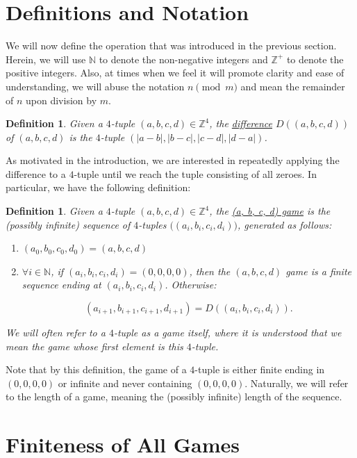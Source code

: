 \documentclass[12pt]{amsart}
\newtheorem{definition}[theorem]{Definition}
\newcommand{\breathe}{\vspace{0.2cm}}
\newcommand{\znn}{\mathbb{N}}
\newcommand{\zp}{\mathbb{Z}^+}
\begin{document}
\section{Definitions and Notation\label{sec:defs}}

We will now define the operation that was introduced in the previous section. Herein, we will use $\znn$ to denote the non-negative integers and $\zp$ to denote the positive integers. Also, at times when we feel it will promote clarity and ease of understanding, we will abuse the notation $n\pmod{m}$ and mean the remainder of $n$ upon division by $m$.

\begin{definition}
Given a $4$-tuple $(a, b, c, d)\in \mathbb{Z}^4$, the \underline{difference} $D((a, b, c, d))$ of $(a,b,c,d)$ is the $4$-tuple $(|a - b|, |b - c|, |c - d|, |d - a|)$.
\end{definition}

As motivated in the introduction, we are interested in repeatedly applying the difference to a $4$-tuple until we reach the tuple consisting of all zeroes. In particular, we have the following definition:

\begin{definition}
Given a $4$-tuple $(a, b, c, d)\in \mathbb{Z}^4$, the \underline{(a, b, c, d) game} is the (possibly infinite) sequence of $4$-tuples $\big((a_i, b_i, c_i, d_i)\big)$, generated as follows:

\begin{enumerate}
\item $(a_0, b_0, c_0, d_0) = (a, b, c, d)$
\item $\forall i\in \znn$, if $(a_i, b_i, c_i, d_i) = (0, 0, 0, 0)$, then the $(a, b, c, d)$ game is a finite sequence ending at $(a_i, b_i, c_i, d_i)$. Otherwise:

$$(a_{i+1}, b_{i+1}, c_{i+1}, d_{i+1})=D((a_i, b_i, c_i, d_i)).$$
\end{enumerate}
\breathe
We will often refer to a $4$-tuple as a game itself, where it is understood that we mean the game whose first element is this $4$-tuple.

\end{definition}

Note that by this definition, the game of a $4$-tuple is either finite ending in $(0, 0, 0, 0)$ or infinite and never containing $(0, 0, 0, 0)$. Naturally, we will refer to the length of a game, meaning the (possibly infinite) length of the sequence.

\section{Finiteness of All Games\label{sec:convergence}}
\end{document}
